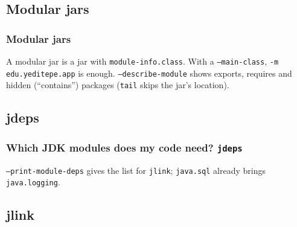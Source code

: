 \documentclass[aspectratio=169,10pt,compress]{beamer}
\begin{document}
\subsection[Jars]{Modular jars}




\begin{frame}[t,fragile] \frametitle{Modular jars}

  \vspace{0.2em}
  \small A modular jar is a jar with \texttt{module-info.class}. With a \texttt{--main-class}, \texttt{-m edu.yeditepe.app} is enough.
  \texttt{--describe-module} shows exports, requires and hidden (``contains'') packages (\texttt{tail} skips the jar's location).
\end{frame}


\subsection[jdeps]{jdeps}




\begin{frame}[t,fragile] \frametitle{Which JDK modules does my code need? \texttt{jdeps}}

  \vspace{0.2em}
  \small \texttt{--print-module-deps} gives the list for \texttt{jlink}; \texttt{java.sql} already brings \texttt{java.logging}.
\end{frame}

\subsection[jlink]{jlink}
\end{document}
